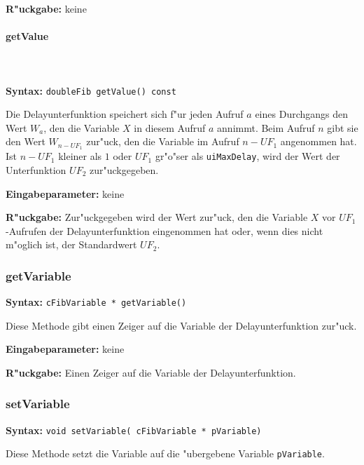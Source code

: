 \bigskip\noindent
\textbf{R"uckgabe:} keine


\paragraph{getValue}

\ \\\\\noindent
\textbf{Syntax:} \verb|doubleFib getValue() const|

\bigskip\noindent
Die Delayunterfunktion speichert sich f"ur jeden Aufruf $a$ eines Durchgangs den Wert $W_a$, den die Variable $X$ in diesem Aufruf $a$ annimmt. Beim Aufruf $n$ gibt sie den Wert $W_{n-UF_1}$ zur"uck, den die Variable im Aufruf $n-UF_1$ angenommen hat. Ist $n-UF_1$ kleiner als $1$ oder $UF_1$ gr"o"ser als \verb|uiMaxDelay|, wird der Wert der Unterfunktion $UF_2$ zur"uckgegeben.

\bigskip\noindent
\textbf{Eingabeparameter:} keine

\bigskip\noindent
\textbf{R"uckgabe:} Zur"uckgegeben wird der Wert zur"uck, den die Variable $X$ vor $UF_1$-Aufrufen der Delayunterfunktion eingenommen hat oder, wenn dies nicht m"oglich ist, der Standardwert $UF_2$.


\subsubsection{getVariable}

\textbf{Syntax:} \verb|cFibVariable * getVariable()|

\bigskip\noindent
Diese Methode gibt einen Zeiger auf die Variable der Delayunterfunktion zur"uck.

\bigskip\noindent
\textbf{Eingabeparameter:} keine

\bigskip\noindent
\textbf{R"uckgabe:} Einen Zeiger auf die Variable der Delayunterfunktion.


\subsubsection{setVariable}

\textbf{Syntax:} \verb|void setVariable( cFibVariable * pVariable)|

\bigskip\noindent
Diese Methode setzt die Variable auf die "ubergebene Variable \verb|pVariable|.

